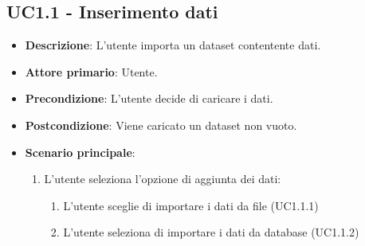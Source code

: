 \subsection{UC1.1 - Inserimento dati}
\label{ssub:UC1.1}
\begin{itemize}
    \item \textbf{Descrizione}: L'utente importa un dataset contentente dati.

    \item \textbf{Attore primario}: Utente.
    
    \item \textbf{Precondizione}:   L'utente decide di caricare i dati.

    \item \textbf{Postcondizione}:  Viene caricato un dataset non vuoto. 

	\item \textbf{Scenario principale}:
		\begin{enumerate}
			\item L'utente seleziona l'opzione di aggiunta dei dati:
            \begin{enumerate}
                \item L'utente sceglie di importare i dati da file (UC1.1.1)
                \item L'utente seleziona di importare i dati da database (UC1.1.2)
            \end{enumerate}
        \end{enumerate}
     
\end{itemize}


